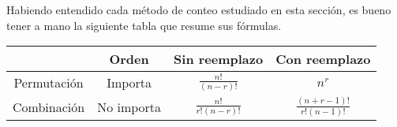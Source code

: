 \documentclass[12pt]{article}
\begin{document}
Habiendo entendido cada método de conteo estudiado en esta sección, es bueno tener a mano la siguiente tabla que resume sus fórmulas.

\begin{table}[hbt!]
\centering
\renewcommand{\arraystretch}{1.7}

\begin{tabular}{c|c c c}
            & Orden & Sin reemplazo & Con reemplazo \\
\hline
Permutación & Importa & $\displaystyle \frac{n!}{(n - r)!}$ & $n^{r}$ \\
Combinación & No importa & $\displaystyle \frac{n!}{r!(n - r)!}$ & $\displaystyle \frac{(n + r - 1)!}{r!(n - 1)!}$
\end{tabular}

\end{table}
\end{document}

